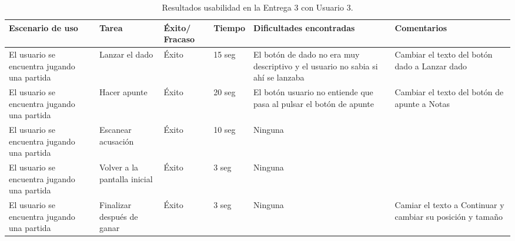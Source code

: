 \begin{table}[h]
  \begin{center}
    \begin{tabular}{|p{2.5cm}|p{1.75cm}|p{1.25cm}|p{1.25cm}|p{2.75cm}|p{3.5cm}|}

      \hline
        \rowcolor{Gray} \textbf{Escenario de uso}
        & \textbf{Tarea}
        & \textbf{Éxito/ Fracaso}
        & \textbf{Tiempo}
        & \textbf{Dificultades encontradas}
        & \textbf{Comentarios}\\

      \hline
      El usuario se encuentra jugando una partida
      & Lanzar el dado
      & Éxito
      & 15 seg
      & El botón de dado no era muy descriptivo y el usuario no sabia si ahí se lanzaba
      & Cambiar el texto del botón dado a Lanzar dado\\

      \hline
      El usuario se encuentra jugando una partida
      & Hacer apunte
      & Éxito
      & 20 seg
      & El botón usuario no entiende que pasa al pulsar el botón de apunte
      & Cambiar el texto del botón de apunte a Notas\\

      \hline
      El usuario se encuentra jugando una partida
      & Escanear acusación
      & Éxito
      & 10 seg
      & Ninguna
      &\\

      \hline
      El usuario se encuentra jugando una partida
      & Volver a la pantalla inicial
      & Éxito
      & 3 seg
      & Ninguna
      &\\

      \hline
      El usuario se encuentra jugando una partida
      & Finalizar después de ganar
      & Éxito
      & 3 seg
      & Ninguna
      & Camiar el texto a Continuar y cambiar su posición y tamaño\\

      \hline

    \end{tabular}

    \caption{Resultados usabilidad en la Entrega 3 con Usuario 3.}
    \label{tabla-entrega-3-usuario3}

  \end{center}
\end{table}

\FloatBarrier


